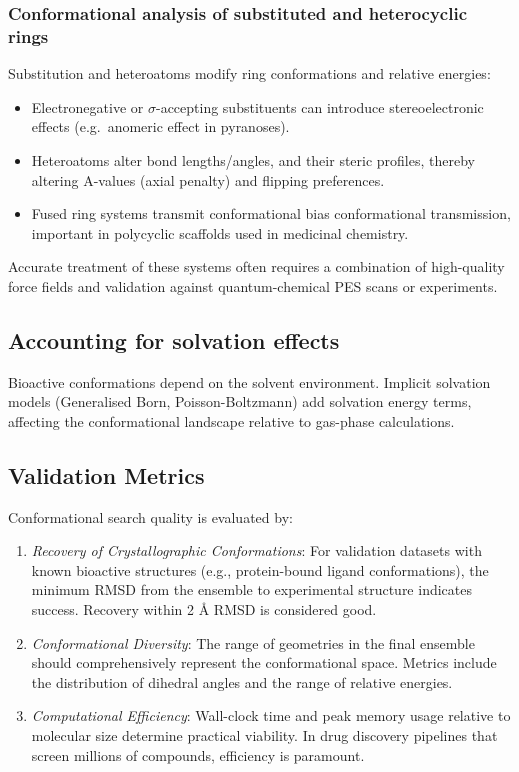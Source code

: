 \documentclass[12pt]{article}
\begin{document}
\subsubsection{Conformational analysis of substituted and heterocyclic rings}

Substitution and heteroatoms modify ring conformations and relative energies:

\begin{itemize}
\item Electronegative or $\sigma$-accepting substituents can introduce stereoelectronic effects (e.g.\ anomeric effect in pyranoses).
\item Heteroatoms alter bond lengths/angles, and their steric profiles, thereby altering A-values (axial penalty) and flipping preferences.
\item Fused ring systems transmit conformational bias conformational transmission, important in polycyclic scaffolds used in medicinal chemistry.
\end{itemize}
Accurate treatment of these systems often requires a combination of high-quality force fields and validation against quantum-chemical PES scans or experiments.

\subsection{Accounting for solvation effects}

Bioactive conformations depend on the solvent environment. Implicit solvation models (Generalised Born, Poisson-Boltzmann) add solvation energy terms, affecting the conformational landscape relative to gas-phase calculations.

\subsection{Validation Metrics}

Conformational search quality is evaluated by:

\begin{enumerate}
\item \textit{Recovery of Crystallographic Conformations}: For validation datasets with known bioactive structures (e.g., protein-bound ligand conformations), the minimum RMSD from the ensemble to experimental structure indicates success. Recovery within 2 \r{A} RMSD is considered good.

\item \textit{Conformational Diversity}: The range of geometries in the final ensemble should comprehensively represent the conformational space. Metrics include the distribution of dihedral angles and the range of relative energies.

\item \textit{Computational Efficiency}: Wall-clock time and peak memory usage relative to molecular size determine practical viability. In drug discovery pipelines that screen millions of compounds, efficiency is paramount.
\end{enumerate}
\end{document}
